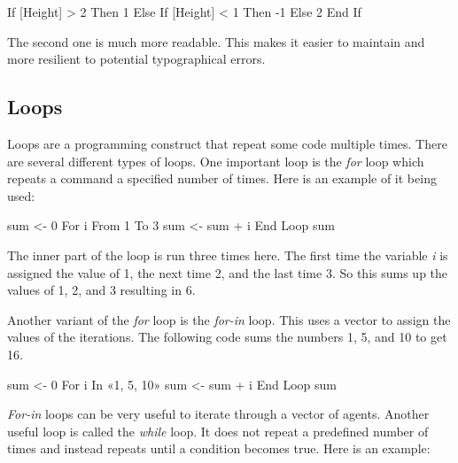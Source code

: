 \documentclass[]{memoir}
\newenvironment{Shaded}{}{}
\newcommand{\DecValTok}[1]{\textcolor[rgb]{0.25,0.63,0.44}{{#1}}}
\newcommand{\NormalTok}[1]{{#1}}
\begin{document}
\begin{Shaded}
\begin{Highlighting}[]
\NormalTok{If [Height] > }\DecValTok{2} \NormalTok{Then}
    \DecValTok{1}
\NormalTok{Else If [Height] < }\DecValTok{1} \NormalTok{Then}
    \NormalTok{-}\DecValTok{1}
\NormalTok{Else}
    \DecValTok{2}
\NormalTok{End If}
\end{Highlighting}
\end{Shaded}

The second one is much more readable. This makes it easier to maintain
and more resilient to potential typographical errors.

\subsection{Loops}

Loops are a programming construct that repeat some code multiple times.
There are several different types of loops. One important loop is the
\emph{for} loop which repeats a command a specified number of times.
Here is an example of it being used:

\begin{Shaded}
\begin{Highlighting}[]
\NormalTok{sum <- }\DecValTok{0}
\NormalTok{For i From }\DecValTok{1} \NormalTok{To }\DecValTok{3}
    \NormalTok{sum <- sum + i}
\NormalTok{End Loop}
\NormalTok{sum}
\end{Highlighting}
\end{Shaded}

The inner part of the loop is run three times here. The first time the
variable \emph{i} is assigned the value of 1, the next time 2, and the
last time 3. So this sums up the values of 1, 2, and 3 resulting in 6.

Another variant of the \emph{for} loop is the \emph{for-in} loop. This
uses a vector to assign the values of the iterations. The following code
sums the numbers 1, 5, and 10 to get 16.

\begin{Shaded}
\begin{Highlighting}[]
\NormalTok{sum <- }\DecValTok{0}
\NormalTok{For i In «1, }\DecValTok{5}\NormalTok{, }\DecValTok{10}\NormalTok{»}
    \NormalTok{sum <- sum + i}
\NormalTok{End Loop}
\NormalTok{sum}
\end{Highlighting}
\end{Shaded}

\emph{For-in} loops can be very useful to iterate through a vector of
agents. Another useful loop is called the \emph{while} loop. It does not
repeat a predefined number of times and instead repeats until a
condition becomes true. Here is an example:
\end{document}
